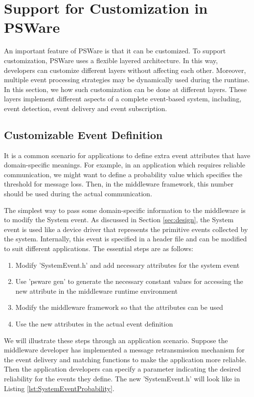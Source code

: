 \section{Support for Customization in PSWare}
\label{sec:flexibility}
An important feature of PSWare is that it can be customized. To support customization, PSWare uses a flexible layered architecture. In this way, developers can customize different layers without affecting each other. Moreover, multiple event processing strategies may be dynamically used during the runtime. In this section, we how such customization can be done at different layers. These layers implement different aspects of a complete event-based system, including, event detection, event delivery and event subscription.

\subsection{Customizable Event Definition}
It is a common scenario for applications to define extra event attributes that have domain-specific meanings. For example, in an application which requires reliable communication, we might want to define a probability value which specifies the threshold for message loss. Then, in the middleware framework, this number should be used during the actual communication.

The simplest way to pass some domain-specific information to the middleware is to modify the System event. As discussed in Section \ref{sec:design}, the System event is used like a device driver that represents the primitive events collected by the system. Internally, this event is specified in a header file and can be modified to suit different applications. The essential steps are as follows:
\begin{enumerate}
\item Modify 'SystemEvent.h' and add necessary attributes for the system event
\item Use 'psware gen' to generate the necessary constant values for accessing the new attribute in the middleware runtime environment
\item Modify the middleware framework so that the attributes can be used
\item Use the new attributes in the actual event definition
\end{enumerate}

We will illustrate these steps through an application scenario. Suppose the middleware developer has implemented a message retransmission mechanism for the event delivery and matching functions to make the application more reliable. Then the application developers can specify a parameter indicating the desired reliability for the events they define. The new 'SystemEvent.h' will look like in Listing \ref{lst:SystemEventProbability}.

